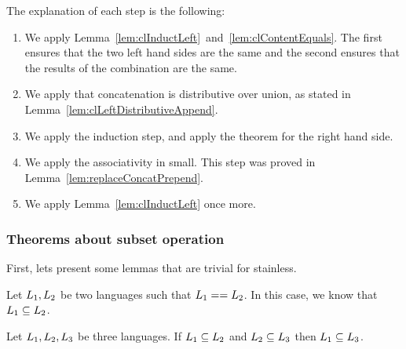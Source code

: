 The explanation of each step is the following: 
\begin{enumerate}
	\item We apply Lemma~\ref{lem:clInductLeft}~and~\ref{lem:clContentEquals}. The first ensures that the two left hand sides are the same and the second ensures that the results of the combination are the same.
	\item We apply that concatenation is distributive over union, as stated in Lemma~\ref{lem:clLeftDistributiveAppend}.
	\item We apply the induction step, and apply the theorem for the right hand side.
	\item We apply the associativity in small. This step was proved in Lemma~\ref{lem:replaceConcatPrepend}.
	\item We apply Lemma~\ref{lem:clInductLeft} once more.
\end{enumerate} 
	

\subsubsection{Theorems about subset operation}

First, lets present some lemmas that are trivial for stainless.

\begin{lemma}[Reflexivity]
	\label{lem:sameAsSubset}
	Let $L_{1}, L_{2}$ be two languages such that $L_{1} == L_{2}$. In this case, we know that $L_{1} \subseteq L_{2}$.
\end{lemma}

\begin{lemma}[Transitivity]
	\label{lem:subsetOfTransitive}
	Let $L_{1}, L_{2}, L_{3}$ be three languages. If $L_{1} \subseteq L_{2}$ and  $L_{2} \subseteq L_{3}$ then  $L_{1} \subseteq L_{3}$.
\end{lemma}

